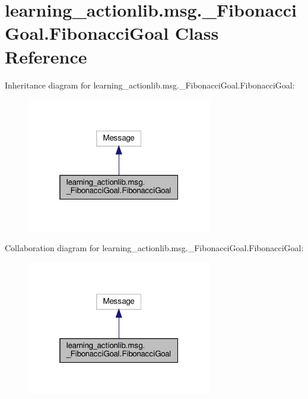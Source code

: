 \hypertarget{classlearning__actionlib_1_1msg_1_1__FibonacciGoal_1_1FibonacciGoal}{}\section{learning\+\_\+actionlib.\+msg.\+\_\+\+Fibonacci\+Goal.\+Fibonacci\+Goal Class Reference}
\label{classlearning__actionlib_1_1msg_1_1__FibonacciGoal_1_1FibonacciGoal}


Inheritance diagram for learning\+\_\+actionlib.\+msg.\+\_\+\+Fibonacci\+Goal.\+Fibonacci\+Goal\+:
\nopagebreak
\begin{figure}[H]
\begin{center}
\leavevmode
\includegraphics[width=229pt]{classlearning__actionlib_1_1msg_1_1__FibonacciGoal_1_1FibonacciGoal__inherit__graph}
\end{center}
\end{figure}


Collaboration diagram for learning\+\_\+actionlib.\+msg.\+\_\+\+Fibonacci\+Goal.\+Fibonacci\+Goal\+:
\nopagebreak
\begin{figure}[H]
\begin{center}
\leavevmode
\includegraphics[width=229pt]{classlearning__actionlib_1_1msg_1_1__FibonacciGoal_1_1FibonacciGoal__coll__graph}
\end{center}
\end{figure}
